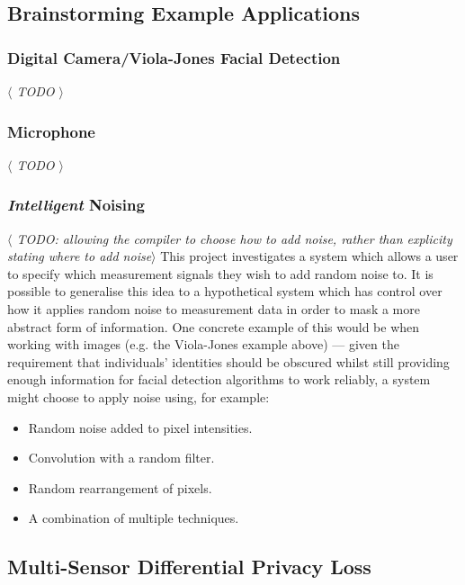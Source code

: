 \documentclass[12pt]{article}
\begin{document}
  \subsection{Brainstorming Example Applications}
    \subsubsection{Digital Camera/Viola-Jones Facial Detection}
      \textit{$\langle$ TODO $\rangle$}

    \subsubsection{Microphone}
      \textit{$\langle$ TODO $\rangle$}

    \subsubsection{\textit{Intelligent} Noising}
      \textit{$\langle$ TODO: allowing the compiler to choose how to add noise, rather than explicity stating where to add noise$\rangle$}
      This project investigates a system which allows a user to specify which measurement signals they wish to add random noise to. It is possible to generalise this idea to a hypothetical system which has control over how it applies random noise to measurement data in order to mask a more abstract form of information. One concrete example of this would be when working with images (e.g. the  Viola-Jones example above) --- given the requirement that individuals' identities should be obscured whilst still providing enough information for facial detection algorithms to work reliably, a system might choose to apply noise using, for example:

      \begin{itemize}
        \item Random noise added to pixel intensities.
        \item Convolution with a random filter.
        \item Random rearrangement of pixels.
        \item A combination of multiple techniques.
      \end{itemize}

  \subsection{Multi-Sensor Differential Privacy Loss} \label{multi_sensor_differential_privacy_loss_section}
\end{document}
